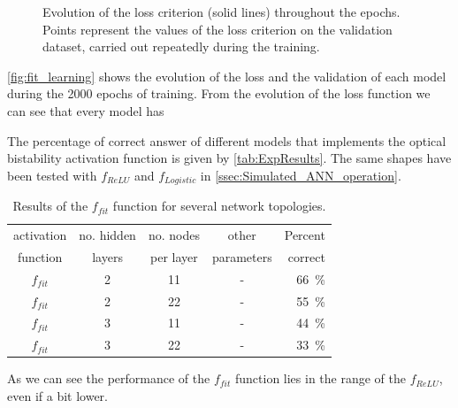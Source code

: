 \begin{figure}[htbp]
	\centering
	
	\caption{Evolution of the loss criterion (solid lines) throughout the epochs.
		Points represent the values of the loss criterion on the validation dataset, carried out repeatedly during the training.
	}
	\label{fig:fit_learning}
\end{figure}

\autoref{fig:fit_learning} shows the evolution of the loss and the validation of each model during the \num{2000} epochs of training.
From the evolution of the loss function we can see that every model has 

The percentage of correct answer of different models that implements the optical bistability activation function is given by \autoref{tab:ExpResults}.
The same shapes have been tested with $f_{ReLU}$ and $f_{Logistic}$ in \autoref{ssec:Simulated_ANN_operation}.

\begin{table}[htbp]
	\centering
	\begin{tabular}{c c c c r}
	\toprule
	activation	& no. hidden 	& no. nodes	& other			& Percent\\
	function		& layers 			& per layer	& parameters	& correct\\
	\midrule
	$f_{fit}$ 			& 2 & 11 & - & \SI{66}{\percent}\\
	$f_{fit}$ 			& 2 & 22 & - & \SI{55}{\percent}\\
	$f_{fit}$ 			& 3 & 11 & - & \SI{44}{\percent}\\
	$f_{fit}$ 			& 3 & 22 & - & \SI{33}{\percent}\\
	\bottomrule
	\end{tabular}
	\caption{Results of the $f_{fit}$ function for several network topologies.
	}
	\label{tab:ExpResults}
\end{table}

As we can see the performance of the $f_{fit}$ function lies in the range of the $f_{ReLU}$, even if a bit lower.
